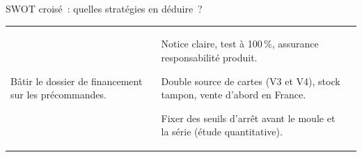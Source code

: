 \begin{frame}{SWOT croisé~: quelles stratégies en déduire~?}
\begin{tabularx}{\textwidth}{@{}>{\raggedright\arraybackslash}p{1.65cm}>{\raggedright\arraybackslash}X>{\raggedright\arraybackslash}X@{}}
\begin{pucesx}
        \item Bâtir le dossier de financement sur les précommandes.
      \end{pucesx} &
      \cellcolor{insabeige}{\sffamily\bfseries\color{insarouge}Éviter}
      \begin{pucesx}
        \item Notice claire, test à 100\,\%, assurance responsabilité produit.
        \item Double source de cartes (V3 et V4), stock tampon, vente d'abord en France.
        \item Fixer des seuils d'arrêt avant le moule et la série (étude quantitative).
      \end{pucesx} \\
  \end{tabularx}
\end{frame}

